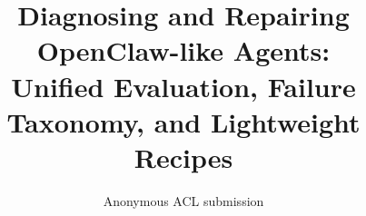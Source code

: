 \documentclass[11pt]{article}
\title{Diagnosing and Repairing OpenClaw-like Agents: \\
  Unified Evaluation, Failure Taxonomy, and Lightweight Recipes}
\author{
  Anonymous ACL submission
}
\begin{document}
\maketitle















\appendix
\onecolumn


\end{document}
